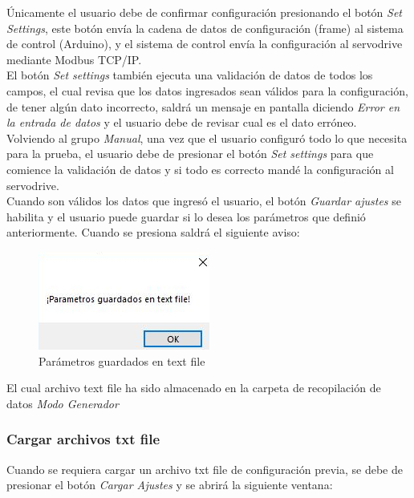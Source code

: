 \documentclass[12pt,titlepage]{article}
\begin{document}
Únicamente el usuario debe de confirmar configuración presionando el botón \textit{Set Settings}, este botón envía la cadena de datos de configuración (frame) al sistema de control (Arduino), y el sistema de control envía la configuración al servodrive mediante Modbus TCP/IP.\\ 

El botón \textit{Set settings} también ejecuta una validación de datos de todos los campos, el cual revisa que los datos ingresados sean válidos para la configuración, de tener algún dato incorrecto, saldrá un mensaje en pantalla diciendo \textit{Error en la entrada de datos} y el usuario debe de revisar cual es el dato erróneo. \\

Volviendo al grupo \textit{Manual}, una vez que el usuario configuró todo lo que necesita para la prueba, el usuario debe de presionar el botón \textit{Set settings} para que comience la validación de datos y si todo es correcto mandé la configuración al servodrive.\\

Cuando son válidos los datos que ingresó el usuario, el botón \textit{Guardar ajustes} se habilita y el usuario puede guardar si lo desea los parámetros que definió anteriormente. Cuando se presiona saldrá el siguiente aviso: \\ 

\begin{figure}[htbp]
\hspace*{5.8cm} 
\includegraphics[scale=0.78]{parametros_save}
\caption{Parámetros guardados en text file}
\end{figure}

El cual archivo text file ha sido almacenado en la carpeta de recopilación de datos \textit{Modo Generador}
\newpage
\subsubsection{Cargar archivos txt file}
Cuando se requiera cargar un archivo txt file de configuración previa, se debe de presionar el botón \textit{Cargar Ajustes} y se abrirá la siguiente ventana: \\ 
\end{document}
